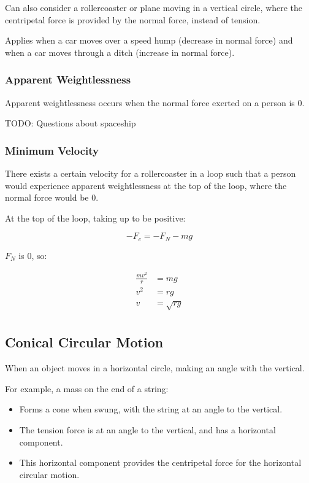 \documentclass[a4paper,11pt]{article}
\begin{document}
Can also consider a rollercoaster or plane moving in a vertical circle, where
the centripetal force is provided by the normal force, instead of tension.

Applies when a car moves over a speed hump (decrease in normal force) and when
a car moves through a ditch (increase in normal force).


\subsubsection{Apparent Weightlessness}

Apparent weightlessness occurs when the normal force exerted on a person is 0.

TODO: Questions about spaceship


\subsubsection{Minimum Velocity}

There exists a certain velocity for a rollercoaster in a loop such that a
person would experience apparent weightlessness at the top of the loop, where
the normal force would be 0.

At the top of the loop, taking up to be positive:

$$
-F_c = -F_N - mg
$$

$F_N$ is 0, so:

$$
\begin{aligned}
\frac{mv^2}{r} & = mg \\
v^2 & = rg \\
v & = \sqrt{rg} \\
\end{aligned}
$$


\subsection{Conical Circular Motion}

When an object moves in a horizontal circle, making an angle with the vertical.

For example, a mass on the end of a string:

\begin{itemize}
\item Forms a cone when swung, with the string at an angle to the vertical.
\item The tension force is at an angle to the vertical, and has a horizontal
	component.
\item This horizontal component provides the centripetal force for the
	horizontal circular motion.
\end{itemize}
\end{document}
